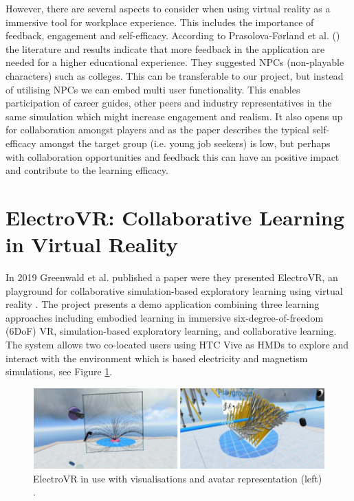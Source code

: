 However, there are several aspects to consider when using virtual reality as a immersive tool for workplace experience. This includes the importance of feedback, engagement and self-efficacy. According to Prasolova-Førland et al. (\citeyear{prasolova2019empowering}) the literature and results indicate that more feedback in the application are needed for a higher educational experience. They suggested NPCs (non-playable characters) such as colleges. This can be transferable to our project, but instead of utilising NPCs we can embed multi user functionality. This enables participation of career guides, other peers and industry representatives in the same simulation which might increase engagement and realism. It also opens up for collaboration amongst players and as the paper describes the typical self-efficacy amongst the target group (i.e. young job seekers) is low, but perhaps with collaboration opportunities and feedback this can have an positive impact and contribute to the learning efficacy.  



\section{ElectroVR: Collaborative Learning in Virtual Reality}
\label{section:electroVR}
In 2019 Greenwald et al. published a paper were they presented ElectroVR, an playground for collaborative simulation-based exploratory learning using virtual reality \cite{greenwald2019electrovr}. The project presents a demo application combining three learning approaches including embodied learning in immersive six-degree-of-freedom (6DoF)  VR,  simulation-based  exploratory  learning,  and collaborative learning. The system allows two co-located users using HTC Vive as HMDs to explore and interact with the environment which is based electricity and  magnetism simulations, see Figure \ref{fig:electroVR}.

 \begin{figure}[!ht]
     \centering
     \includegraphics[width=.9\textwidth]{./fig/related_work/electroVR.PNG}
     \caption{ElectroVR in use with visualisations and avatar representation (left) \cite{greenwald2019electrovr}. }
     \label{fig:electroVR}
 \end{figure}
 
